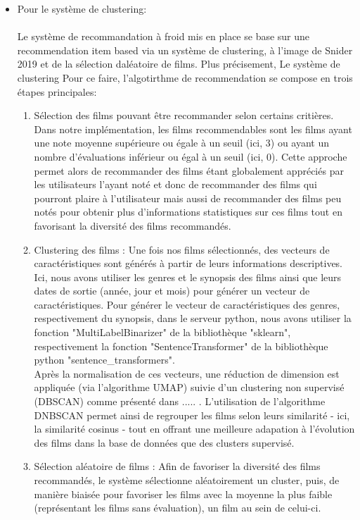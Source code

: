 \documentclass{article}
\begin{document}
\begin{itemize}
    \item Pour le système de clustering:\\
          $ $\\
          Le système de recommandation à froid mis en place se base sur une recommendation item based via un système de clustering, à l'image de Snider 2019 \cite{snider_unsupervised} et de la sélection daléatoire de films.
          Plus précisement, Le système de clustering
          Pour ce faire, l'algotirthme de recommendation se compose en trois étapes principales:\\
          \begin{enumerate}
              \item Sélection des films pouvant être recommander selon certains critières. Dans notre implémentation, les films recommendables sont les films ayant une note moyenne supérieure ou égale à un seuil (ici, 3) ou
                    ayant un nombre d’évaluations inférieur ou égal à un seuil (ici, 0). Cette approche permet alors de recommander des films étant globalement appréciés par les utilisateurs l'ayant noté et donc de recommander des films qui
                    pourront plaire à l'utilisateur mais aussi de recommander des films peu notés pour obtenir plus d'informations statistiques sur ces films tout en favorisant la diversité des films recommandés.
              \item Clustering des films : Une fois nos films sélectionnés, des vecteurs de caractéristiques sont générés à partir de leurs informations descriptives. Ici, nous avons utiliser les genres et le synopsis des films ainsi que leurs dates de
                    sortie (année, jour et mois) pour générer un vecteur de caractéristiques. Pour générer le vecteur de caractéristiques des genres, respectivement du synopsis, dans le serveur python, nous avons utiliser la fonction "MultiLabelBinarizer" de
                    la bibliothèque "sklearn", respectivement la fonction "SentenceTransformer" de la bibliothèque python "sentence\_transformers".\\
                    Après la normalisation de ces vecteurs, une réduction de dimension est appliquée (via l’algorithme UMAP) suivie d’un clustering non supervisé (DBSCAN) comme présenté dans ..... . L'utilisation de l'algorithme DNBSCAN permet ainsi de regrouper
                    les films selon leurs similarité - ici, la similarité cosinus - tout en offrant une meilleure adapation à l'évolution des films dans la base de données que des clusters supervisé.
              \item Sélection aléatoire de films : Afin de favoriser la diversité des films recommandés, le système sélectionne aléatoirement un cluster, puis, de manière biaisée pour favoriser les films avec la moyenne la plus faible (représentant les films sans évaluation), un film au sein de celui-ci.

\end{enumerate}
\end{itemize}
\end{document}
